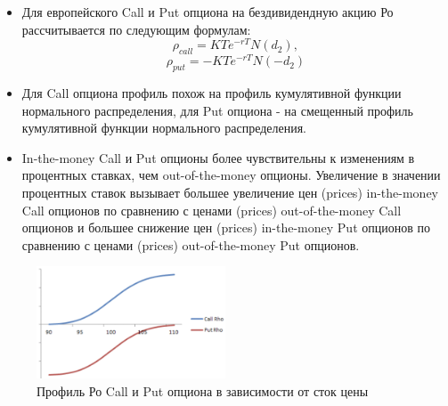 \documentclass{article}
\begin{document}
 \begin{itemize}
 \item Для европейского Call и Put опциона на бездивидендную акцию Ро рассчитывается по следующим формулам:
 $$\rho_{call} = KTe^{-rT} N(d_2),$$
 $$\rho_{put} = -KTe^{-rT} N(-d_2)$$
 
 \item Для Call опциона профиль похож на профиль кумулятивной функции нормального распределения, для Put опциона - на смещенный профиль кумулятивной функции нормального распределения.
 
\item In-the-money Call и Put опционы более чувствительны к изменениям в процентных ставках, чем out-of-the-money опционы. Увеличение в значении процентных ставок вызывает большее увеличение цен (prices) in-the-money Call опционов по сравнению с ценами (prices) out-of-the-money Call опционов и большее снижение цен (prices) in-the-money Put опционов по сравнению с ценами (prices) out-of-the-money Put опционов.

   \end{itemize}
\newpage


   \begin{figure}[h]
	\centering
	\includegraphics[width=0.5\textwidth]{rho-price1.jpg}
	\caption{Профиль Ро Call и Put опциона в зависимости от сток цены}
	\label{model}
\end{figure}
\end{document}
